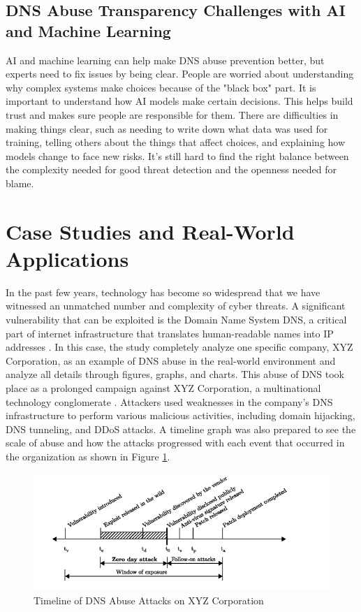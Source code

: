 \subsection{DNS Abuse Transparency Challenges with AI and Machine Learning}

AI and machine learning can help make DNS abuse prevention better, but experts need to fix issues by being clear. People are worried about understanding why complex systems make choices because of the "black box" part. It is important to understand how AI models make certain decisions. This helps build trust and makes sure people are responsible for them. There are difficulties in making things clear, such as needing to write down what data was used for training, telling others about the things that affect choices, and explaining how models change to face new risks. It's still hard to find the right balance between the complexity needed for good threat detection and the openness needed for blame.

\section{Case Studies and Real-World Applications}

In the past few years, technology has become so widespread that we have witnessed an unmatched number and complexity of cyber threats. A significant vulnerability that can be exploited is the Domain Name System DNS, a critical part of internet infrastructure that translates human-readable names into IP addresses \cite{kumari2021sac115}. In this case, the study completely analyze one specific company, XYZ Corporation, as an example of DNS abuse in the real-world environment and analyze all details through figures, graphs, and charts. This abuse of DNS took place as a prolonged campaign against XYZ Corporation, a multinational technology conglomerate \cite{mohammed2021network}. Attackers used weaknesses in the company's DNS infrastructure to perform various malicious activities, including domain hijacking, DNS tunneling, and DDoS attacks. A timeline graph was also prepared to see the scale of abuse and how the attacks progressed with each event that occurred in the organization as shown in Figure \ref{fig:figureOne}.

\begin{figure}[ht]
\centering
\includegraphics{background/XYZ1.png}
\caption{Timeline of DNS Abuse Attacks on XYZ Corporation}
\label{fig:figureOne}
\end{figure}

